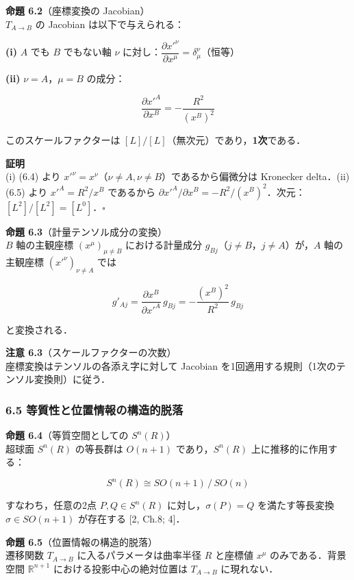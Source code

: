 \documentclass[a4paper,11pt]{ltjsarticle}
\theoremstyle{definition}
\begin{document}
\textbf{命題 6.2}（座標変換の Jacobian）\\
\(T_{A \to B}\) の Jacobian は以下で与えられる：

\textbf{(i)} \(A\) でも \(B\) でもない軸 \(\nu\) に対し：\(\dfrac{\partial x'^\nu}{\partial x^\mu} = \delta^\nu_\mu\)（恒等）

\textbf{(ii)} \(\nu = A\)，\(\mu = B\) の成分：

\[\frac{\partial x'^A}{\partial x^B} = -\frac{R^2}{(x^B)^2} \tag{6.6}\]

このスケールファクターは \([L]/[L]\)（無次元）であり，\textbf{1次}である．

\textbf{証明}\\
(i) (6.4) より \(x'^\nu = x^\nu\)（\(\nu \neq A, \nu \neq B\)）であるから偏微分は Kronecker delta．(ii) (6.5) より \(x'^A = R^2/x^B\) であるから \(\partial x'^A/\partial x^B = -R^2/(x^B)^2\)．次元：\([L^2]/[L^2] = [L^0]\)．\(\square\)

\textbf{命題 6.3}（計量テンソル成分の変換）\\
\(B\) 軸の主観座標 \((x^\mu)_{\mu \neq B}\) における計量成分 \(g_{Bj}\)（\(j \neq B\)，\(j \neq A\)）が，\(A\) 軸の主観座標 \((x'^\nu)_{\nu \neq A}\) では

\[g'_{Aj} = \frac{\partial x^B}{\partial x'^A}\, g_{Bj} = -\frac{(x^B)^2}{R^2}\, g_{Bj} \tag{6.7}\]

と変換される．

\textbf{注意 6.3}（スケールファクターの次数）\\
座標変換はテンソルの各添え字に対して Jacobian を1回適用する規則（1次のテンソル変換則）に従う．

\subsubsection{6.5 等質性と位置情報の構造的脱落}\label{ux7b49ux8ceaux6027ux3068ux4f4dux7f6eux60c5ux5831ux306eux69cbux9020ux7684ux8131ux843d}

\textbf{命題 6.4}（等質空間としての \(S^n(R)\)）\\
超球面 \(S^n(R)\) の等長群は \(O(n+1)\) であり，\(S^n(R)\) 上に推移的に作用する：

\[S^n(R) \cong SO(n+1)\,/\,SO(n) \tag{6.8}\]

すなわち，任意の2点 \(P, Q \in S^n(R)\) に対し，\(\sigma(P) = Q\) を満たす等長変換 \(\sigma \in SO(n+1)\) が存在する {[}2, Ch.8; 4{]}．

\textbf{命題 6.5}（位置情報の構造的脱落）\\
遷移関数 \(T_{A \to B}\) に入るパラメータは曲率半径 \(R\) と座標値 \(x^\mu\) のみである．背景空間 \(\mathbb{R}^{n+1}\) における投影中心の絶対位置は \(T_{A \to B}\) に現れない．
\end{document}
